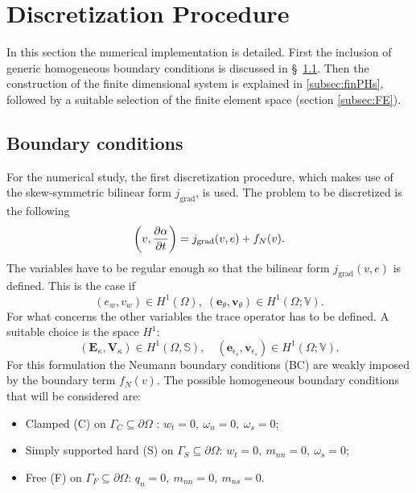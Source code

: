 \documentclass{ifacconf}
\begin{document}
\section{Discretization Procedure}
\label{sec:discr}
In this section the numerical implementation is detailed. First the inclusion of generic homogeneous boundary conditions is discussed in \S~\ref{subsec:bcs}. Then the construction of the finite dimensional system is explained in \ref{subsec:finPHs}, followed by a suitable selection of the finite element space (section \ref{subsec:FE}).

\subsection{Boundary conditions}
\label{subsec:bcs}

For the numerical study, the first discretization procedure, which makes use of the skew-symmetric bilinear form $j_{\text{grad}}$, is used. The problem to be discretized is the following
\begin{equation}
	\left(v, \diffp{\alpha}{t}\right) = j_{\text{grad}}(v, e) + f_N(v).
\end{equation}
The variables have to be regular enough so that the bilinear form  $j_{\text{grad}}(v, e)$ is defined. This is the case if
\begin{equation}
(e_w, v_w) \in H^1(\Omega), \; (\bm{e}_{\theta}, \bm{v}_{\theta}) \in H^1(\Omega; \mathbb{V}).
\end{equation}
For what concerns the other variables the trace operator has to be defined. A suitable choice is the space $H^1$:
\begin{equation}
(\bm{E}_\kappa, \bm{V}_\kappa)  \in H^1(\Omega, \mathbb{S}), \quad (\bm{e}_{\epsilon_s}, \bm{v}_{\epsilon_s}) \in H^1(\Omega; \mathbb{V}).
\end{equation}
For this formulation the Neumann boundary conditions (BC) are weakly imposed by the boundary term $f_N(v)$. The possible homogeneous boundary conditions that will be considered are:
\begin{itemize}
	\item Clamped (C) on $\Gamma_{C}\subseteq \partial \Omega$ : $w_t = 0, \ \omega_{n} = 0, \ \omega_{s}=0$;
	\item Simply supported hard (S) on $\Gamma_{S}\subseteq \partial \Omega$: $w_t = 0, \ m_{nn} = 0, \ \omega_{s}=0$;
	\item Free (F) on $\Gamma_{F}\subseteq \partial \Omega$: $ q_n = 0, \ m_{nn}=0, \ m_{ns} = 0$.
\end{itemize}
\end{document}
